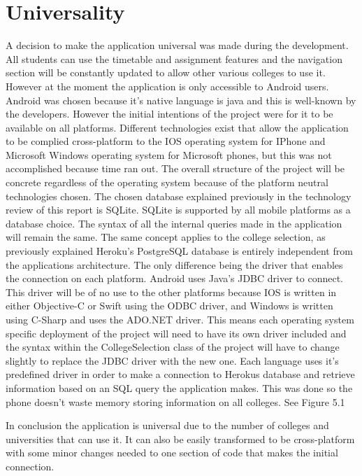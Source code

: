 \section{Universality}
A decision to make the application universal was made during the development. All students can use the timetable and assignment features and the navigation section will be constantly updated to allow other various colleges to use it. However at the moment the application is only accessible to Android users. Android was chosen because it's native language is java and this is well-known by the developers. However the initial intentions of the project were for it to be available on all platforms. Different technologies exist that allow the application to be complied cross-platform to the IOS operating system for IPhone and Microsoft Windows operating system for Microsoft phones, but this was not accomplished because time ran out. The overall structure of the project will be concrete regardless of the operating system because of the platform neutral technologies chosen. The chosen database explained previously in the technology review of this report is SQLite. SQLite is supported by all mobile platforms as a database choice. The syntax of all the internal queries made in the application will remain the same. The same concept applies to the college selection, as previously explained Heroku's PostgreSQL database is entirely independent from the applications architecture. The only difference being the driver that enables the connection on each platform. Android uses Java's JDBC driver to connect. This driver will be of no use to the other platforms because IOS is written in either Objective-C or Swift using the ODBC driver, and Windows is written using C-Sharp and uses the ADO.NET driver. This means each operating system specific deployment of the project will need to have its own driver included and the syntax within the CollegeSelection class of the project will have to change slightly to replace the JDBC driver with the new one. Each language uses it's predefined driver in order to make a connection to Herokus database and retrieve information based on an SQL query the application makes. This was done so the phone doesn't waste memory storing information on all colleges. See Figure 5.1

In conclusion the application is universal due to the number of colleges and universities that can use it. It can also be easily transformed to be cross-platform with some minor changes needed to one section of code that makes the initial connection.

